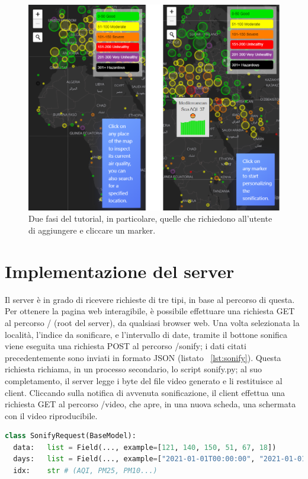 \begin{figure}[h]
  \includegraphics[width=\linewidth]{img/tutorial.png}
  \caption{Due fasi del tutorial, in particolare, quelle che richiedono all'utente di aggiungere e cliccare un marker.}
  \label{fig:tutorial}
\end{figure}

\newpage


\section{Implementazione del server}
Il server è in grado di ricevere richieste di tre tipi, in base al percorso di questa.
Per ottenere la pagina web interagibile, è possibile effettuare una richiesta GET al percorso / (root del server), da qualsiasi browser web.
Una volta selezionata la località, l'indice da sonificare, e l'intervallo di date, tramite il bottone sonifica viene eseguita una richiesta POST al percorso /sonify; i dati citati precedentemente sono inviati in formato JSON (listato ~\ref{lst:sonify}).
Questa richiesta richiama, in un processo secondario, lo script sonify.py; al suo completamento, il server legge i byte del file video generato e li restituisce al client.
Cliccando sulla notifica di avvenuta sonificazione, il client effettua una richiesta GET al percorso /video, che apre, in una nuova scheda, una schermata con il video riproducibile.

\begin{lstlisting}[language=Python,caption={La funzione che gestisce la richiesta /sonify.},label={lst:sonify}]
class SonifyRequest(BaseModel):
  data:   list = Field(..., example=[121, 140, 150, 51, 67, 18])
  days:   list = Field(..., example=["2021-01-01T00:00:00", "2021-01-01T00:00:01"])
  idx:    str # (AQI, PM25, PM10...)
\end{lstlisting}



